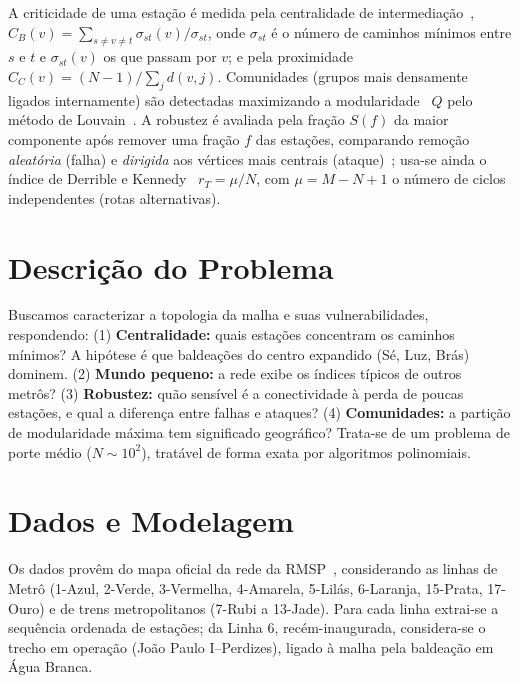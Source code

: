 \documentclass[12pt]{article}
\begin{document}
A criticidade de uma estação é medida pela centralidade de
intermediação~\cite{freeman1977},
$C_B(v)=\sum_{s\neq v\neq t}\sigma_{st}(v)/\sigma_{st}$, onde $\sigma_{st}$ é o
número de caminhos mínimos entre $s$ e $t$ e $\sigma_{st}(v)$ os que passam por
$v$; e pela proximidade $C_C(v)=(N-1)/\sum_j d(v,j)$. Comunidades (grupos mais
densamente ligados internamente) são detectadas maximizando a
modularidade~\cite{newman2006} $Q$ pelo método de Louvain~\cite{blondel2008}. A
robustez é avaliada pela fração $S(f)$ da maior componente após remover uma
fração $f$ das estações, comparando remoção \emph{aleatória} (falha) e
\emph{dirigida} aos vértices mais centrais (ataque)~\cite{berche2009}; usa-se
ainda o índice de Derrible e Kennedy~\cite{derrible2010} $r_T=\mu/N$, com
$\mu=M-N+1$ o número de ciclos independentes (rotas alternativas).

\section{Descrição do Problema}

Buscamos caracterizar a topologia da malha e suas vulnerabilidades, respondendo:
(1) \textbf{Centralidade:} quais estações concentram os caminhos mínimos? A
hipótese é que baldeações do centro expandido (Sé, Luz, Brás) dominem. (2)
\textbf{Mundo pequeno:} a rede exibe os índices típicos de outros metrôs? (3)
\textbf{Robustez:} quão sensível é a conectividade à perda de poucas estações, e
qual a diferença entre falhas e ataques? (4) \textbf{Comunidades:} a partição de
modularidade máxima tem significado geográfico? Trata-se de um problema de porte
médio ($N\sim 10^2$), tratável de forma exata por algoritmos polinomiais.

\section{Dados e Modelagem}
\label{sec:dados}

Os dados provêm do mapa oficial da rede da RMSP~\cite{metrosp2026,cptm2026},
considerando as linhas de Metrô (1-Azul, 2-Verde, 3-Vermelha, 4-Amarela,
5-Lilás, 6-Laranja, 15-Prata, 17-Ouro) e de trens metropolitanos (7-Rubi a
13-Jade). Para cada linha extrai-se a sequência ordenada de estações; da Linha 6,
recém-inaugurada, considera-se o trecho em operação (João Paulo I--Perdizes),
ligado à malha pela baldeação em Água Branca.
\end{document}
